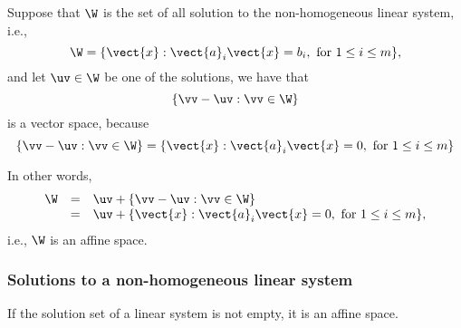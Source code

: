 \begin{frame}
  Suppose that $\W$ is the set of all solution to the non-homogeneous
  linear system, i.e.,
  \[
  \W = \{\vect{x} : \vect{a}_i\vect{x} = b_i, \ \mbox{for $1\leq i\leq m$}\},
  \]
  and let $\uv\in \W$ be one of the solutions, we have that
  \[
  \{\vv - \uv : \vv\in\W \} 
  \]
  \pause
  is a vector space, because
  \pause
  \[
  \{\vv - \uv : \vv\in\W \}
  =
  \{\vect{x} : \vect{a}_i\vect{x} = 0, \ \mbox{for $1\leq i\leq m$}\}
  \]

  \vspace{0.1in}
  \pause

  In other words,
  \[
  \begin{array}{rcl}
    \W &=& \uv + \{\vv - \uv : \vv\in\W \}  \\
    &=& \uv + \{\vect{x} : \vect{a}_i\vect{x} = 0, \ \mbox{for $1\leq i\leq m$}\},
  \end{array}
  \]
  \pause
  i.e., $\W$ is an affine space.
\end{frame}

\begin{frame}
  \frametitle{Solutions to a non-homogeneous linear system}

  \begin{lemma}
    If the solution set of a linear system is not empty, it is an
    affine space.
  \end{lemma}
\end{frame}
